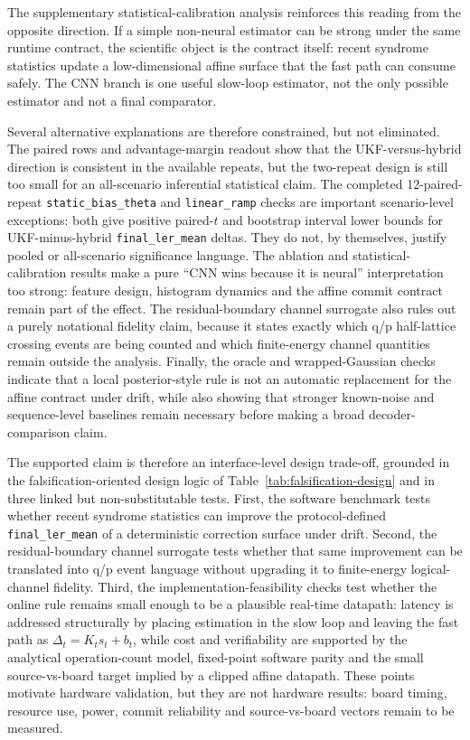 \documentclass[11pt]{article}
\newcommand{\finalLER}{\texttt{final\_ler\_mean}}
\begin{document}
The supplementary statistical-calibration analysis reinforces this reading from
the opposite direction.  If a simple non-neural estimator can be strong under
the same runtime contract, the scientific object is the contract itself:
recent syndrome statistics update a low-dimensional affine surface that the
fast path can consume safely.  The CNN branch is one useful slow-loop
estimator, not the only possible estimator and not a final comparator.

Several alternative explanations are therefore constrained, but not eliminated.
The paired rows and advantage-margin readout show that the UKF-versus-hybrid
direction is consistent in the available repeats, but the two-repeat design is
still too small for an all-scenario inferential statistical claim.  The
completed 12-paired-repeat \texttt{static\_bias\_theta} and
\texttt{linear\_ramp} checks are important scenario-level exceptions: both give
positive paired-\(t\) and bootstrap interval lower bounds for UKF-minus-hybrid
\finalLER{} deltas.  They do not, by themselves, justify pooled or
all-scenario significance language.  The ablation and
statistical-calibration results make a pure ``CNN wins because it is neural''
interpretation too strong: feature design, histogram dynamics and the affine
commit contract remain part of the effect.  The residual-boundary channel
surrogate also rules out a purely notational fidelity claim, because it states
exactly which q/p half-lattice crossing events are being counted and which
finite-energy channel quantities remain outside the analysis.  Finally, the oracle and
wrapped-Gaussian checks indicate that a local posterior-style rule is not an
automatic replacement for the affine contract under drift, while also showing
that stronger known-noise and sequence-level baselines remain necessary before
making a broad decoder-comparison claim.

The supported claim is therefore an interface-level design trade-off, grounded
in the falsification-oriented design logic of
Table~\ref{tab:falsification-design} and in three linked but
non-substitutable tests.  First, the software benchmark tests
whether recent syndrome statistics can improve the protocol-defined
\finalLER{} of a deterministic correction surface under drift.  Second, the
residual-boundary channel surrogate tests whether that same improvement can be
translated into q/p event language without upgrading it to finite-energy
logical-channel fidelity.  Third, the implementation-feasibility checks test
whether the online rule remains small enough to be a plausible real-time
datapath: latency is addressed structurally by placing estimation in the slow
loop and leaving the fast path as \(\Delta_t=K_t s_t+b_t\), while cost and
verifiability are supported by the analytical operation-count model,
fixed-point software parity and the small source-vs-board target implied by a
clipped affine datapath.  These points motivate hardware validation, but they
are not hardware results: board timing, resource use, power, commit
reliability and source-vs-board vectors remain to be measured.
\end{document}
